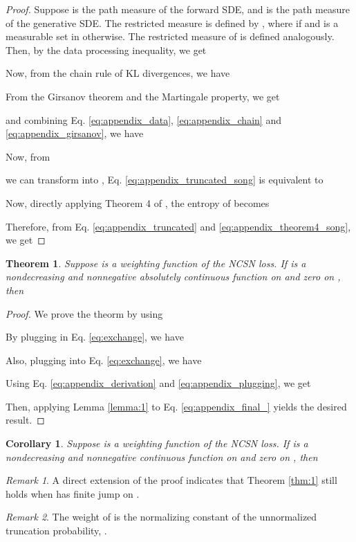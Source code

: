 \documentclass[nohyperref]{article}
\theoremstyle{plain}
\newtheorem{theorem}{Theorem}\newtheorem{proposition}{Proposition}
\newtheorem{corollary}{Corollary}
\theoremstyle{definition}
\theoremstyle{remark}
\newtheorem{remark}{Remark}
\begin{document}
\begin{proof}
Suppose  is the path measure of the forward SDE, and  is the path measure of the generative SDE. The restricted measure is defined by , where  if  and  is a measurable set in  otherwise. The restricted measure of  is defined analogously. Then, by the data processing inequality, we get

Now, from the chain rule of KL divergences, we have

From the Girsanov theorem and the Martingale property, we get

and combining Eq. \eqref{eq:appendix_data}, \eqref{eq:appendix_chain} and \eqref{eq:appendix_girsanov}, we have

Now, from

we can transform  into , Eq. \eqref{eq:appendix_truncated_song} is equivalent to

Now, directly applying Theorem 4 of \citet{song2021maximum}, the entropy of  becomes

Therefore, from Eq. \eqref{eq:appendix_truncated} and \eqref{eq:appendix_theorem4_song}, we get

\end{proof}

\begingroup
	\renewcommand\thetheorem{1}
\begin{theorem}Suppose  is a weighting function of the NCSN loss. If  is a nondecreasing and nonnegative absolutely continuous function on  and zero on , then

\end{theorem}
\endgroup

\begin{proof}
We prove the theorm by using

By plugging  in Eq. \eqref{eq:exchange}, we have


Also, plugging  into Eq. \eqref{eq:exchange}, we have


Using Eq. \eqref{eq:appendix_derivation} and \eqref{eq:appendix_plugging}, we get

Then, applying Lemma \ref{lemma:1} to Eq. \eqref{eq:appendix_final_} yields the desired result.
\end{proof}

\begin{corollary}Suppose  is a weighting function of the NCSN loss. If  is a nondecreasing and nonnegative continuous function on  and zero on , then

\end{corollary}

\begin{remark}
A direct extension of the proof indicates that Theorem \ref{thm:1} still holds when  has finite jump on .
\end{remark}
\begin{remark}
The weight of  is the normalizing constant of the unnormalized truncation probability, .
\end{remark}
\end{document}
